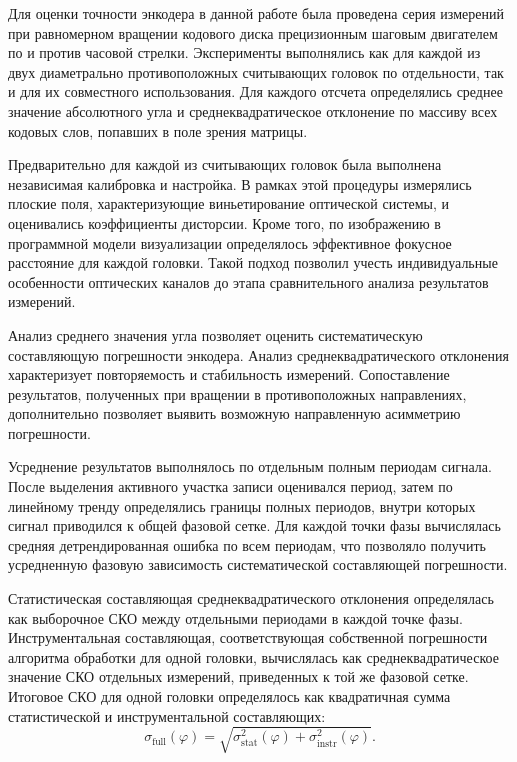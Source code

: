 Для оценки точности энкодера в данной работе была проведена серия измерений при равномерном вращении кодового диска прецизионным шаговым двигателем по и против часовой стрелки. Эксперименты выполнялись как для каждой из двух диаметрально противоположных считывающих головок по отдельности, так и для их совместного использования. Для каждого отсчета определялись среднее значение абсолютного угла и среднеквадратическое отклонение по массиву всех кодовых слов, попавших в поле зрения матрицы.

Предварительно для каждой из считывающих головок была выполнена независимая калибровка и настройка. В рамках этой процедуры измерялись плоские поля, характеризующие виньетирование оптической системы, и оценивались коэффициенты дисторсии. Кроме того, по изображению в программной модели визуализации определялось эффективное фокусное расстояние для каждой головки. Такой подход позволил учесть индивидуальные особенности оптических каналов до этапа сравнительного анализа результатов измерений.

Анализ среднего значения угла позволяет оценить систематическую составляющую погрешности энкодера. Анализ среднеквадратического отклонения характеризует повторяемость и стабильность измерений. Сопоставление результатов, полученных при вращении в противоположных направлениях, дополнительно позволяет выявить возможную направленную асимметрию погрешности.

Усреднение результатов выполнялось по отдельным полным периодам сигнала. После выделения активного участка записи оценивался период, затем по линейному тренду определялись границы полных периодов, внутри которых сигнал приводился к общей фазовой сетке. Для каждой точки фазы вычислялась средняя детрендированная ошибка по всем периодам, что позволяло получить усредненную фазовую зависимость систематической составляющей погрешности.

Статистическая составляющая среднеквадратического отклонения определялась как выборочное СКО между отдельными периодами в каждой точке фазы. Инструментальная составляющая, соответствующая собственной погрешности алгоритма обработки для одной головки, вычислялась как среднеквадратическое значение СКО отдельных измерений, приведенных к той же фазовой сетке. Итоговое СКО для одной головки определялось как квадратичная сумма статистической и инструментальной составляющих:
\begin{equation*}
\sigma_{\mathrm{full}}(\varphi)=\sqrt{\sigma_{\mathrm{stat}}^2(\varphi)+\sigma_{\mathrm{instr}}^2(\varphi)}.
\end{equation*}

